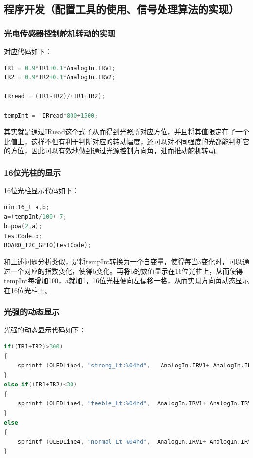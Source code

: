 {\subsection{程序开发（配置工具的使用、信号处理算法的实现）}
\subsubsection{光电传感器控制舵机转动的实现}
\par{对应代码如下：}

\begin{lstlisting}[language = C]
IR1 = 0.9*IR1+0.1*AnalogIn.IRV1;
IR2 = 0.9*IR2+0.1*AnalogIn.IRV2;

IRread = (IR1-IR2)/(IR1+IR2);

tempInt = -IRread*800+1500;
\end{lstlisting}

\par{其实就是通过IRread这个式子从而得到光照所对应方位，并且将其值限定在了一个比值上，这样不但有利于判断对应的转动幅度，还可以对不同强度的光都能判断它的方位，因此可以有效地做到通过光源控制方向角，进而推动舵机转动。}

\subsubsection{16位光柱的显示}
\par{16位光柱显示代码如下：}

\begin{lstlisting}[language = C]
uint16_t a,b;
a=(tempInt/100)-7;
b=pow(2,a);
testCode=b;
BOARD_I2C_GPIO(testCode);
\end{lstlisting}

\par{和上述问题分析类似，是将tempInt转换为一个自变量，使得每当a变化时，可以通过一个对应的指数变化，使得b变化。再将b的数值显示在16位光柱上，从而使得tempInt每增加100，a就加1，16位光柱便向左偏移一格，从而实现方向角动态显示在16位光柱上。}

\subsubsection{光强的动态显示}
\par{光强的动态显示代码如下：}

\begin{lstlisting}[language = C]
if((IR1+IR2)>300)
{
    sprintf (OLEDLine4, "strong_Lt:%04hd",   AnalogIn.IRV1+ AnalogIn.IRV2);
}
else if((IR1+IR2)<30)
{
    sprintf (OLEDLine4, "feeble_Lt:%04hd",  AnalogIn.IRV1+ AnalogIn.IRV2);
}
else
{
    sprintf (OLEDLine4, "normal_Lt %04hd",  AnalogIn.IRV1+ AnalogIn.IRV2);
}


\end{lstlisting}}
